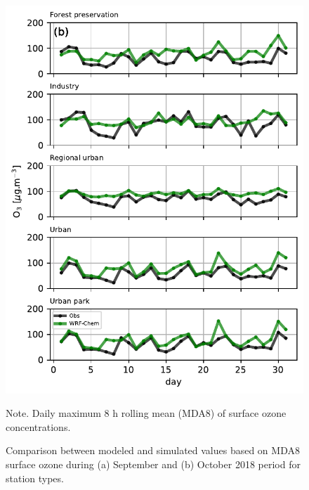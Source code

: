 \begin{figure}[!ht]
\begin{center}
\begin{minipage}{.49\linewidth}
    \includegraphics[width=\linewidth]{fig/MDA8_type_oct18.pdf}
  \end{minipage}
  \end{center}
  \caption{Comparison between modeled and simulated values based on MDA8 surface ozone during (a) September and (b) October 2018 period for station types.}
  {\scriptsize Note. Daily maximum 8 h rolling mean (MDA8) of surface ozone concentrations.}
  \label{fig: MDA8_type_current}
\end{figure}

